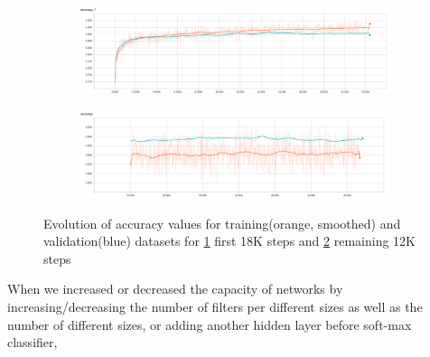 \begin{figure}[h!]
	\centering
	\begin{subfigure}{0.8\columnwidth}
		\centering
		\includegraphics[width=\linewidth]{accuracy1.png}
		\caption{}
		\label{fig:18k}
	\end{subfigure}
	\begin{subfigure}{0.8\columnwidth}
		\centering
		\includegraphics[width=\linewidth]{accuracy2.png}
		\caption{}
		\label{fig:30k}
	\end{subfigure}
	\caption{Evolution of accuracy values for training(orange, smoothed) and validation(blue) datasets for \ref{fig:18k} first 18K steps and \ref{fig:30k} remaining 12K steps}
	\label{fig:cnn_train}
\end{figure}

When we increased or decreased the capacity of networks by increasing/decreasing the number of filters per different sizes as well as the number of different sizes, or adding another hidden layer before soft-max classifier, 
